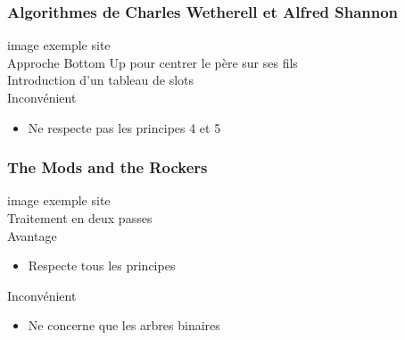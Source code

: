 \begin{frame}
	\frametitle{Algorithmes de Charles Wetherell et Alfred Shannon}
	image exemple site \\
	Approche Bottom Up pour centrer le père sur ses fils\\
	Introduction d'un tableau de slots\\
	Inconvénient
	\begin{itemize}
		\item Ne respecte pas les principes 4 et 5
	\end{itemize}
\end{frame}

\begin{frame}
	\frametitle{The Mods and the Rockers}
	image exemple site \\
	Traitement en deux passes\\
	Avantage
	\begin{itemize}
		\item Respecte tous les principes
	\end{itemize}
	Inconvénient
	\begin{itemize}
		\item Ne concerne que les arbres binaires
	\end{itemize}
\end{frame}

